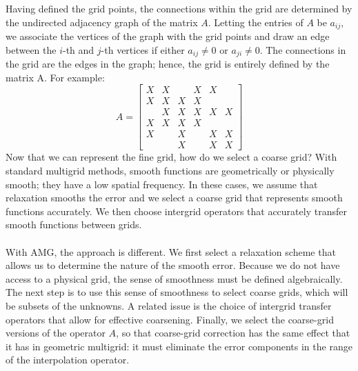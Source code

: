 \documentclass[11pt]{book}
\begin{document}
Having defined the grid points, the connections within the grid are determined by the undirected adjacency graph of the matrix $A$. Letting the entries of $A$ be $a_{i j}$, we associate the vertices of the graph with the grid points and draw an edge between the $i$-th and $j$-th vertices if either $a_{i j} \neq 0$ or $a_{j i} \neq 0$. The connections in the grid are the edges in the graph; hence, the grid is entirely defined by the matrix A. For example:
$$
A=\left[\begin{array}{llllll}
X & X & & X & X & \\
X & X & X & X & & \\
& X & X & X & X & X \\
X & X & X & X & & \\
X & & X & & X & X \\
& & X & & X & X
\end{array}\right]
$$
Now that we can represent the fine grid, how do we select a coarse grid? With standard multigrid methods, smooth functions are geometrically or physically smooth; they have a low spatial frequency. In these cases, we assume that relaxation smooths the error and we select a coarse grid that represents smooth functions accurately. We then choose intergrid operators that accurately transfer smooth functions between grids.\\ \\
With AMG, the approach is different. We first select a relaxation scheme that allows us to determine the nature of the smooth error. Because we do not have access to a physical grid, the sense of smoothness must be defined algebraically. The next step is to use this sense of smoothness to select coarse grids, which will be subsets of the unknowns. A related issue is the choice of intergrid transfer operators that allow for effective coarsening. Finally, we select the coarse-grid versions of the operator $A$, so that coarse-grid correction has the same effect that it has in geometric multigrid: it must eliminate the error components in the range of the interpolation operator.
\end{document}
